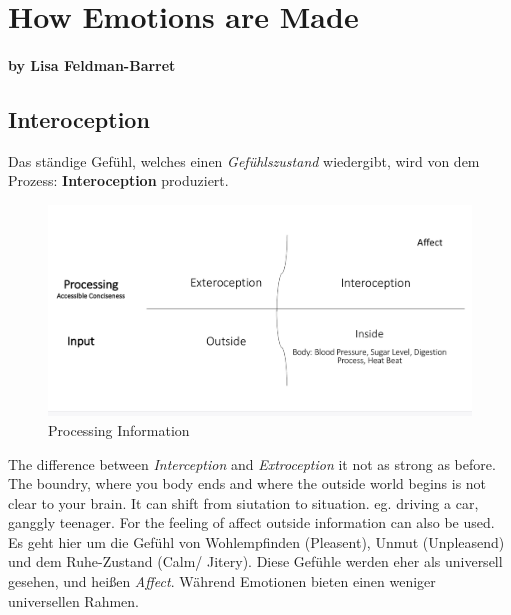 \section{How Emotions are Made}
\paragraph{by Lisa Feldman-Barret}

\subsection{Interoception}

Das ständige Gefühl, welches einen \textit{Gefühlszustand} wiedergibt, wird von dem Prozess: \textbf{Interoception}  produziert.\\

\begin{figure}[H]
	\centering
	\includegraphics[scale = 0.1]{attachment/chapter_OWN/Scc001}
	\caption{Processing Information}
\end{figure}

The difference between \textit{Interception} and \textit{Extroception} it not as strong as before. The boundry, where you body ends and where the outside world begins is not clear to your brain. It can shift from siutation to situation. eg. driving a car, ganggly teenager. For the feeling of affect outside information can also be used.\\ 

Es geht hier um die Gefühl von Wohlempfinden (Pleasent), Unmut (Unpleasend) und dem Ruhe-Zustand (Calm/ Jitery). Diese Gefühle werden eher als universell gesehen, und heißen \textit{Affect}.  Während Emotionen bieten einen weniger universellen Rahmen.


